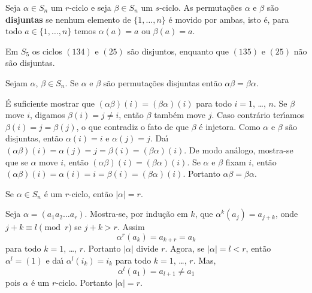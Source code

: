 \begin{definicao}
	Seja $\alpha \in S_n$ um $r$-ciclo e seja $\beta \in S_n$ um $s$-ciclo. As permuta\c{c}\~oes $\alpha$ e $\beta$ s\~ao \textbf{disjuntas} se nenhum elemento de $\{1, \dots, n\}$ \'e movido por ambas, isto \'e, para todo $a \in \{1, \dots, n\}$ temos $\alpha(a) = a$ ou $\beta(a) = a$.
\end{definicao}

\begin{exemplos}
	Em $S_5$ os ciclos $(134)$ e $(25)$ s\~ao disjuntos, enquanto que $(135)$ e $(25)$ n\~ao s\~ao disjuntas.
\end{exemplos}

\begin{lema}
	Sejam $\alpha$, $\beta \in S_n$. Se $\alpha$ e $\beta$ s\~ao permuta\c{c}\~oes disjuntas ent\~ao $\alpha\beta = \beta\alpha$.
\end{lema}
\begin{prova}
	\'E suficiente mostrar que $(\alpha\beta)(i) = (\beta\alpha)(i)$ para todo $i = 1$, \dots, $n$. Se $\beta$ move $i$, digamos $\beta(i) = j \ne i$, ent\~ao $\beta$ tamb\'em move $j$. Caso contr\'ario ter{\'\i}amos $\beta(i) = j = \beta(j)$, o que contradiz o fato de que $\beta$ \'e injetora. Como $\alpha$ e $\beta$ s\~ao disjuntas, ent\~ao $\alpha(i) = i$ e $\alpha(j) = j$. Da{\'\i} $(\alpha\beta)(i) = \alpha(j) = j = \beta(i) = (\beta\alpha)(i)$. De modo an\'alogo, mostra-se que se $\alpha$ move $i$, ent\~ao $(\alpha\beta)(i) = (\beta\alpha)(i)$. Se $\alpha$ e $\beta$ fixam $i$, ent\~ao $(\alpha\beta)(i) = \alpha(i) = i = \beta(i) = (\beta\alpha)(i)$. Portanto $\alpha\beta = \beta\alpha$.
\end{prova}

\begin{lema}
	Se $\alpha \in S_n$ \'e um $r$-ciclo, ent\~ao $|\alpha| = r$.
\end{lema}
\begin{prova}
	Seja $\alpha = (a_1 a_2 \dots a_r)$. Mostra-se, por indu\c{c}\~ao em $k$, que $\alpha^k(a_j) = a_{j + k}$, onde $j + k \equiv l \pmod r$ se $j + k > r$. Assim
	\[
		\alpha^r(a_k) = a_{k + r} = a_k
	\]
	para todo $k = 1$, \dots, $r$. Portanto $|\alpha|$ divide $r$. Agora, se $|\alpha| = l < r$, ent\~ao $\alpha^l = (1)$ e da{\'\i} $\alpha^l(i_k) = i_k$ para todo $k = 1$, \dots, $r$. Mas,
	\[
		\alpha^l(a_1) = a_{l + 1} \ne a_1
	\]
	pois $\alpha$ \'e um $r$-ciclo. Portanto $|\alpha| = r$.
\end{prova}

